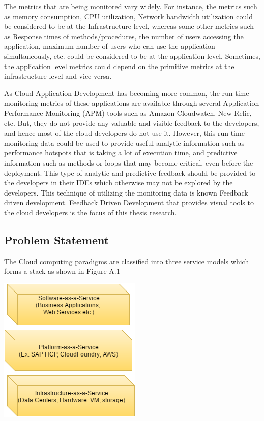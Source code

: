 \documentclass[article,type=msc,colorback,12pt,accentcolor=tud7b]{tudthesis}
\begin{document}
	\par The metrics that are being monitored vary widely. For instance, the metrics such as memory consumption, CPU utilization, Network bandwidth utilization could be considered to be at the Infrastructure level, whereas some other metrics such as Response times of methods/procedures, the number of users accessing the application, maximum number of users who can use the application simultaneously, etc. could be considered to be at the application level. Sometimes, the application level metrics could depend on the primitive metrics at the infrastructure level and vice versa.
	
	\par As Cloud Application Development has becoming more common, the run time monitoring metrics of these applications are available through several Application Performance Monitoring (APM) tools such as Amazon Cloudwatch, New Relic, etc. But, they do not provide any valuable and visible feedback to the developers, and hence most of the cloud developers do not use it. However, this run-time monitoring data could be used to provide useful analytic information such as performance hotspots that is taking a lot of execution time, and predictive information such as methods or loops that may become critical, even before the deployment. This type of analytic and predictive feedback should be provided to the developers in their IDEs which otherwise may not be explored by the developers. This technique of utilizing the monitoring data is known Feedback driven development. Feedback Driven Development that provides visual tools to the cloud developers is the focus of this thesis research.	
	
	\subsection{Problem Statement}	
	
The Cloud computing paradigms are classified into three service models which forms a stack as shown in Figure A.1 

\begin{center}
\includegraphics[scale=0.7]{A1}
\end{center}
\end{document}
